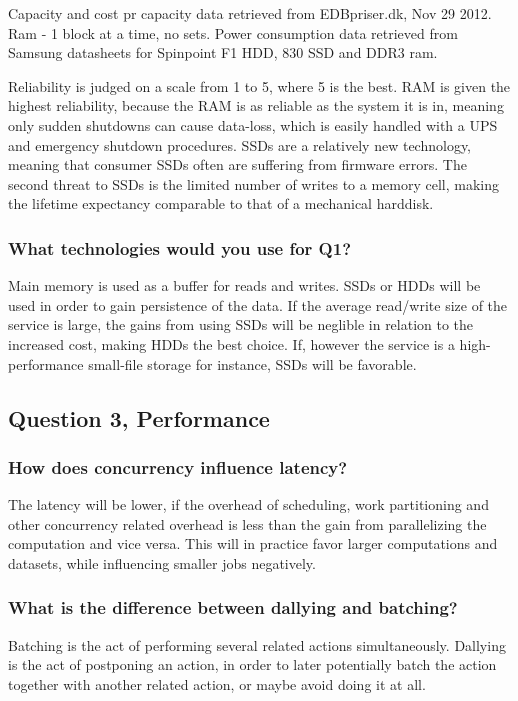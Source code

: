 \documentclass[11pt,a4paper]{article}
\begin{document}
Capacity and cost pr capacity data retrieved from EDBpriser.dk, Nov 29 2012.
Ram - 1 block at a time, no sets. Power consumption data retrieved from Samsung datasheets for
Spinpoint F1 HDD, 830 SSD and DDR3 ram.

Reliability is judged on a scale from 1 to 5, where 5 is the best.
RAM is given the highest reliability, because the RAM is as reliable
as the system it is in, meaning only sudden shutdowns can cause data-loss,
which is easily handled with a UPS and emergency shutdown procedures.
SSDs are a relatively new technology, meaning that consumer SSDs often
are suffering from firmware errors. The second threat to SSDs is the limited
number of writes to a memory cell, making the lifetime expectancy comparable
to that of a mechanical harddisk.

\subsubsection{What technologies would you use for Q1?}
Main memory is used as a buffer for reads and writes. SSDs or HDDs will be used in order to gain persistence of the data.
If the average read/write size of the service is large, the gains from using SSDs will be neglible in relation to the increased cost,
making HDDs the best choice. If, however the service is a high-performance small-file storage for instance, SSDs will be favorable.


\subsection{Question 3, Performance}
\subsubsection{How does concurrency influence latency?}

The latency will be lower, if the overhead of scheduling, work partitioning and
other concurrency related overhead is less than the gain from parallelizing the
computation and vice versa. This will in practice favor larger computations and
datasets, while influencing smaller jobs negatively.

\subsubsection{What is the difference between dallying and batching?}

Batching is the act of performing several related actions simultaneously.
Dallying is the act of postponing an action, in order to later potentially batch
the action together with another related action, or maybe avoid doing it at all.
\end{document}
